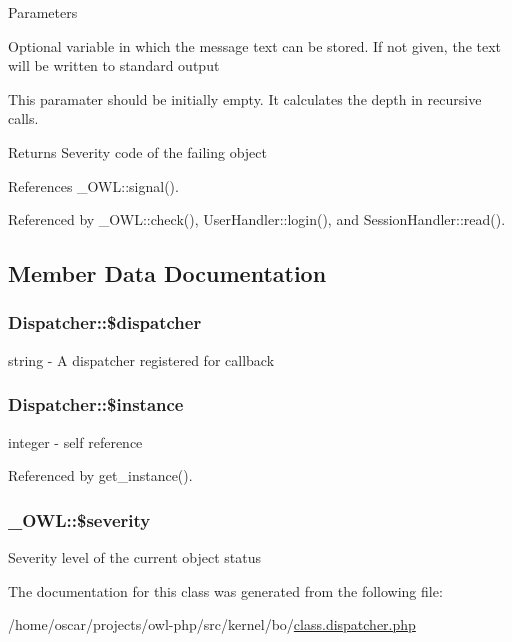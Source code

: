 \begin{DoxyParams}{Parameters}
\item[\mbox{\tt[out]} {\em \$text}]Optional variable in which the message text can be stored. If not given, the text will be written to standard output \item[\mbox{\tt[in]} {\em \$depth}]This paramater should be initially empty. It calculates the depth in recursive calls. \end{DoxyParams}
\begin{DoxyReturn}{Returns}
Severity code of the failing object 
\end{DoxyReturn}


References \_\-OWL::signal().



Referenced by \_\-OWL::check(), UserHandler::login(), and SessionHandler::read().



\subsection{Member Data Documentation}
\subsubsection[{\$dispatcher}]{\setlength{\rightskip}{0pt plus 5cm}Dispatcher::\$dispatcher}\label{classDispatcher_a606996a08d440fdd121443870b942e39}
string -\/ A dispatcher registered for callback 
\subsubsection[{\$instance}]{\setlength{\rightskip}{0pt plus 5cm}Dispatcher::\$instance}\label{classDispatcher_a676b77546f23eb5bae93d28362664eb8}
integer -\/ self reference 

Referenced by get\_\-instance().

\subsubsection[{\$severity}]{\setlength{\rightskip}{0pt plus 5cm}\_\-OWL::\$severity}\label{class__OWL_ad26b40a9dbbacb33e299b17826f8327c}
Severity level of the current object status 

The documentation for this class was generated from the following file:\begin{DoxyCompactItemize}
\item 
/home/oscar/projects/owl-\/php/src/kernel/bo/\hyperlink{class_8dispatcher_8php}{class.dispatcher.php}\end{DoxyCompactItemize}
